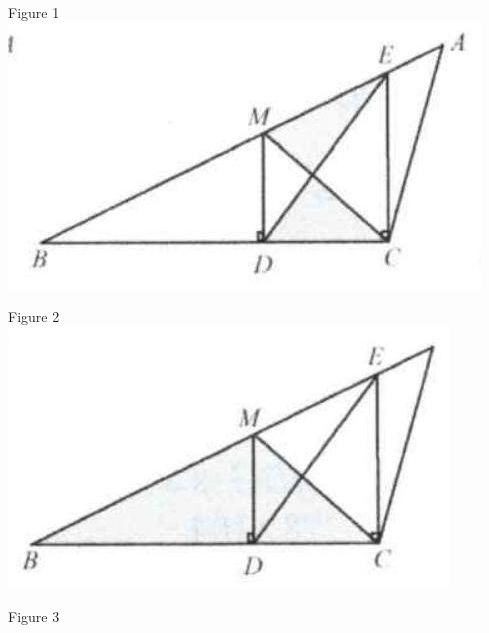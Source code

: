 \documentclass[10pt]{article}
\begin{document}
Figure 1\\
\includegraphics[max width=\textwidth, center]{2025_04_17_97bc1f7e44d93c271a88g-018}

Figure 2\\
\includegraphics[max width=\textwidth, center]{2025_04_17_97bc1f7e44d93c271a88g-018(1)}

Figure 3
\end{document}
